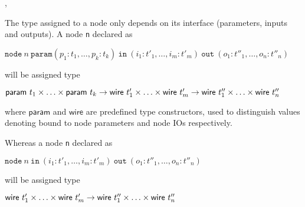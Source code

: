 {\TE,\VE~ \vdash
  ~~~~~
  }

The type assigned to a node only depends on its interface (parameters, inputs and outputs).
A node \texttt{n} declared as

\begin{center}
$\mathtt{node}~n~\mathtt{param}(p_1:t_1,\ldots,p_k:t_k)~\mathtt{in}~(i_1:t'_1,\ldots,i_m:t'_m)~\mathtt{out}~(o_1:t''_1,\ldots,o_n:t''_n)$
\end{center}

\medskip
will be assigned type

\medskip
\begin{center}
$\mathsf{param}~t_1\times\ldots\times \mathsf{param}~t_k \rightarrow \mathsf{wire}~t'_1\times\ldots\times
  \mathsf{wire}~t'_m \rightarrow \mathsf{wire}~t''_1\times\ldots\times \mathsf{wire}~t''_n$
\end{center}

\noindent
where $\mathsf{param}$ and $\mathsf{wire}$ are predefined type constructors, used to distinguish
values denoting bound to node parameters and node IOs respectively.

\medskip
Whereas a node \texttt{n} declared as

\begin{center}
$\mathtt{node}~n~\mathtt{in}~(i_1:t'_1,\ldots,i_m:t'_m)~\mathtt{out}~(o_1:t''_1,\ldots,o_n:t''_n)$
\end{center}

will be assigned type

\begin{center}
$\mathsf{wire}~t'_1\times\ldots\times \mathsf{wire}~t'_m \rightarrow \mathsf{wire}~t''_1\times\ldots\times \mathsf{wire}~t''_n$
\end{center}

